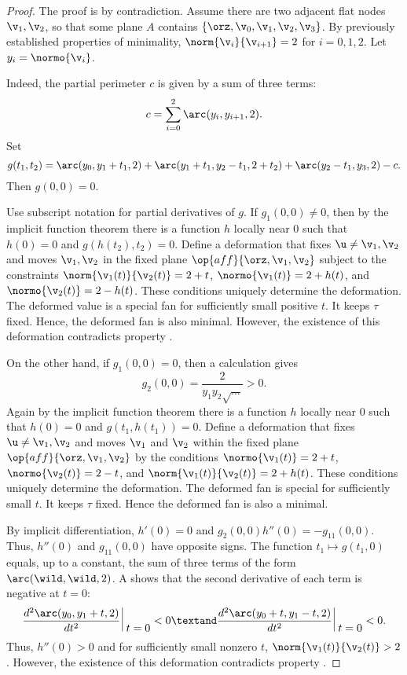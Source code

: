 \begin{proof}  The proof is by contradiction.
Assume there are two adjacent flat nodes $\v_1,\v_2$, so that
some plane $A$  contains $\{\orz,\v_0,\v_1,\v_2,\v_3\}$.
By previously established properties of minimality,
%
$\norm{\v_i}{\v_{i+1}}=2$ for $i=0,1,2$.  Let $y_i = \normo{\v_i}$.
%

  Indeed, the partial
perimeter $c$ is given by a sum of three terms:
\[ 
c=\sum_{i=0}^2\arc(y_i,y_{i+1},2).
\] 
Set
\[ 
  g(t_1,t_2) = \arc(y_0,y_1+t_1,2) 
+ \arc(y_1+t_1,y_2-t_1,2+t_2) + \arc(y_2-t_1,y_3,2) - c.
\] 
Then $g(0,0)=0$.  

Use subscript notation for partial derivatives of $g$.  If $g_1(0,0)
\ne 0$, then by the implicit function theorem there is a function $h$
locally near $0$ such that $h(0)=0$ and $g(h(t_2),t_2)=0$.  Define a
deformation that fixes $\u\ne\v_1,\v_2$ and moves $\v_1,\v_2$ in the
fixed plane $\op{aff}\{\orz,\v_1,\v_2\}$ subject to the constraints
$\norm{\v_1(t)}{\v_2(t)}=2+t$, $\normo{\v_1(t)} = 2+h(t)$, and
$\normo{\v_2(t)} = 2-h(t)$.  These conditions uniquely determine the
deformation.  The deformed value is a special fan for sufficiently
small positive $t$.  It keeps $\tau$ fixed.  Hence, the deformed fan is
also minimal.  However, the existence of this deformation contradicts
property .

On the other hand, if $ g_1(0,0) =0$, then a calculation gives
\[ g_2(0,0) = \dfrac{2}{y_1y_2\sqrt{\ldots}} >
0.\]  Again by the implicit function theorem there is
a function $h$ locally near $0$ such that $h(0)=0$ and
$g(t_1,h(t_1))=0$.  Define a deformation that fixes $\u\ne \v_1,\v_2$
and moves $\v_1$ and $\v_2$ within the fixed plane
$\op{aff}\{\orz,\v_1,\v_2\}$ by the conditions $\normo{\v_1(t)} = 2 +
t$, $\normo{\v_2(t)} = 2 - t$, and $\norm{\v_1(t)}{\v_2(t)}=2+h(t)$.
These conditions uniquely determine the deformation.  The deformed fan
is special for sufficiently small $t$.  It keeps $\tau$ fixed.  Hence
the deformed fan is also a minimal.

By implicit differentiation, $h'(0) = 0$ and $g_2(0,0) h''(0) =
-g_{11}(0,0)$.  Thus, $h''(0)$ and $g_{11}(0,0)$ have opposite signs.
The function $t_1\mapsto g(t_1,0)$ equals, up to a constant, the sum
of three terms of the form $\arc(\wild,\wild,2)$.
A  shows that the second derivative of each
term  is negative at $t=0$:
\begin{equation}\label{eqn:arc''}
\def\vt{\vrule_{\relax{\raisebox{-0.55em}{\ensuremath{\displaystyle{~t=0}}}}}}
\frac{d^2 \arc(y_0,y_1+t,2)}{d t^2}\,\vt < 0\textand
\dfrac{d^2 \arc(y_0+t,y_1-t,2)}{d t^2}\,\vt < 0.
\end{equation}  
Thus, $h''(0)>0$
and for sufficiently small nonzero $t$, $\norm{\v_1(t)}{\v_2(t)}>2$.
However, the existence of this deformation contradicts property
.
\end{proof}


